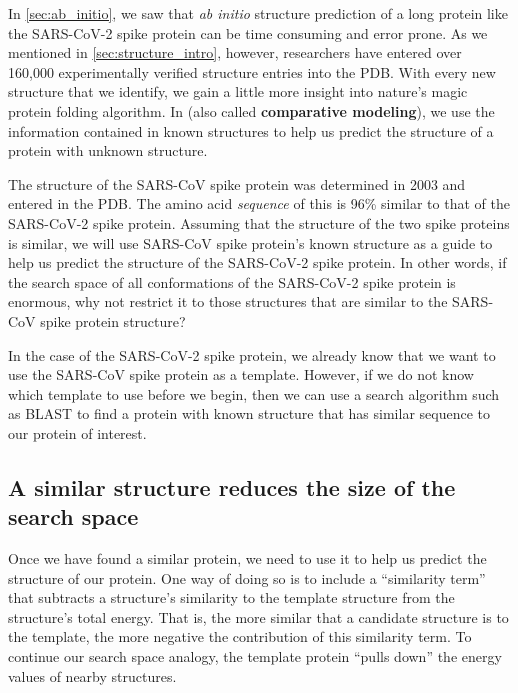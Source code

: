 In \autoref{sec:ab_initio}, we saw that \textit{ab initio} structure prediction of a long protein like the SARS-CoV-2 spike protein can be time consuming and error prone. As we mentioned in \autoref{sec:structure_intro}, however, researchers have entered over 160,000 experimentally verified structure entries into the PDB. With every new structure that we identify, we gain a little more insight into nature's magic protein folding algorithm. In  (also called \textbf{comparative modeling}), we use the information contained in known structures to help us predict the structure of a protein with unknown structure.

The structure of the SARS-CoV spike protein was determined in 2003 and entered in the PDB. The amino acid \textit{sequence} of this  is 96\% similar to that of the SARS-CoV-2 spike protein. Assuming that the structure of the two spike proteins is similar, we will use SARS-CoV spike protein's known structure as a guide to help us predict the structure of the SARS-CoV-2 spike protein. In other words, if the search space of all conformations of the SARS-CoV-2 spike protein is enormous, why not restrict it to those structures that are similar to the SARS-CoV spike protein structure?

In the case of the SARS-CoV-2 spike protein, we already know that we want to use the SARS-CoV spike protein as a template. However, if we do not know which template to use before we begin, then we can use a search algorithm such as BLAST to find a protein with known structure that has similar sequence to our protein of interest.

\FloatBarrier
{}
\subsection{A similar structure reduces the size of the search space}

Once we have found a similar protein, we need to use it to help us predict the structure of our protein. One way of doing so is to include a ``similarity term'' that subtracts a structure's similarity to the template structure from the structure's total energy. That is, the more similar that a candidate structure is to the template, the more negative the contribution of this similarity term. To continue our search space analogy, the template protein ``pulls down'' the energy values of nearby structures.

